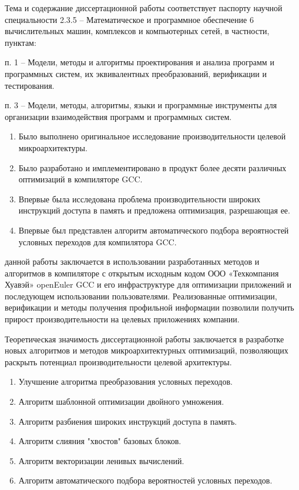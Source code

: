 Тема и содержание диссертационной работы соответствует паспорту научной
специальности 2.3.5 – Математическое и программное обеспечение
6
вычислительных машин, комплексов и компьютерных сетей, в частности, пунктам:

п. 1 – Модели, методы и алгоритмы проектирования и анализа программ
и программных систем, их эквивалентных преобразований, верификации и тестирования.

п. 3 – Модели, методы, алгоритмы, языки и программные инструменты
для организации взаимодействия программ и программных систем.

{\novelty}
\begin{enumerate}[beginpenalty=10000] %
  \item Было выполнено оригинальное исследование производительности целевой микроархитектуры.
  \item Было разработано и имплементировано в продукт более десяти различных оптимизаций в компиляторе GCC.
  \item Впервые была исследована проблема производительности широких инструкций доступа в память и предложена оптимизация, разрешающая ее. 
  \item Впервые был представлен алгоритм автоматического подбора вероятностей условных переходов для компилятора GCC.
\end{enumerate}

{\influence}  данной работы заключается в использовании
разработанных методов и алгоритмов в  компиляторе с открытым исходным кодом  ООО «Техкомпания Хуавэй»  openEuler GCC и его
инфраструктуре для оптимизации приложений и последующем использовании пользователями. Реализованные оптимизации, верификации
и методы получения профильной информации позволили получить прирост производительности
на целевых приложениях компании.

Теоретическая значимость диссертационной работы заключается в разработке
новых алгоритмов и методов микроархитектурных оптимизаций, позволяющих раскрыть потенциал производительности целевой архитектуры.

{}
\begin{enumerate}[beginpenalty=10000] %
  \item Улучшение алгоритма преобразования условных переходов.
  \item Алгоритм шаблонной оптимизации двойного умножения.
  \item Алгоритм разбиения широких инструкций доступа в память.
  \item Алгоритм слияния "хвостов" базовых блоков.
  \item Алгоритм векторизации ленивых вычислений.
  \item Алгоритм автоматического подбора вероятностей условных переходов.
\end{enumerate}

